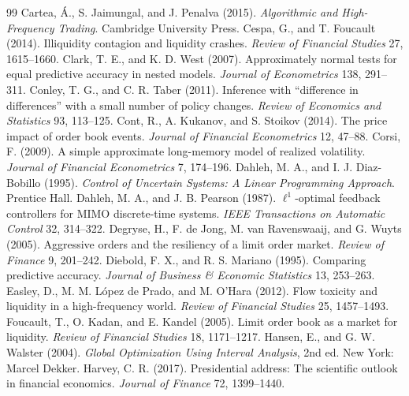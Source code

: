 \begin{thebibliography}{99}
 Cartea, \'A., S. Jaimungal, and J. Penalva (2015). \emph{Algorithmic and High-Frequency Trading}. Cambridge University Press.
 Cespa, G., and T. Foucault (2014). Illiquidity contagion and liquidity crashes. \emph{Review of Financial Studies} 27, 1615--1660.
 Clark, T. E., and K. D. West (2007). Approximately normal tests for equal predictive accuracy in nested models. \emph{Journal of Econometrics} 138, 291--311.
 Conley, T. G., and C. R. Taber (2011). Inference with ``difference in differences'' with a small number of policy changes. \emph{Review of Economics and Statistics} 93, 113--125.
 Cont, R., A. Kukanov, and S. Stoikov (2014). The price impact of order book events. \emph{Journal of Financial Econometrics} 12, 47--88.
 Corsi, F. (2009). A simple approximate long-memory model of realized volatility. \emph{Journal of Financial Econometrics} 7, 174--196.
 Dahleh, M. A., and I. J. Diaz-Bobillo (1995). \emph{Control of Uncertain Systems: A Linear Programming Approach}. Prentice Hall.
 Dahleh, M. A., and J. B. Pearson (1987). $\ell^1$-optimal feedback controllers for MIMO discrete-time systems. \emph{IEEE Transactions on Automatic Control} 32, 314--322.
 Degryse, H., F. de Jong, M. van Ravenswaaij, and G. Wuyts (2005). Aggressive orders and the resiliency of a limit order market. \emph{Review of Finance} 9, 201--242.
 Diebold, F. X., and R. S. Mariano (1995). Comparing predictive accuracy. \emph{Journal of Business \& Economic Statistics} 13, 253--263.
 Easley, D., M. M. L\'opez de Prado, and M. O'Hara (2012). Flow toxicity and liquidity in a high-frequency world. \emph{Review of Financial Studies} 25, 1457--1493.
 Foucault, T., O. Kadan, and E. Kandel (2005). Limit order book as a market for liquidity. \emph{Review of Financial Studies} 18, 1171--1217.
 Hansen, E., and G. W. Walster (2004). \emph{Global Optimization Using Interval Analysis}, 2nd ed. New York: Marcel Dekker.
 Harvey, C. R. (2017). Presidential address: The scientific outlook in financial economics. \emph{Journal of Finance} 72, 1399--1440.

\end{thebibliography}
